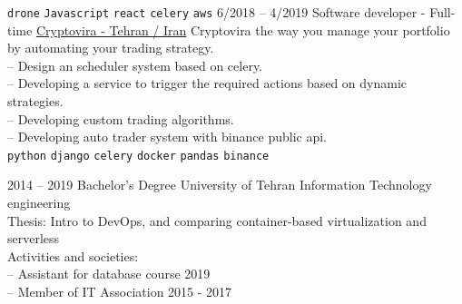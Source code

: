 \documentclass[9pt]{developercv}
\begin{document}
\begin{entrylist}
{		\texttt{drone}\slashsep
		\texttt{Javascript}\slashsep
		\texttt{react}\slashsep
		\texttt{celery}\slashsep
		\texttt{aws}\slashsep
	}
	\entry
	{6/2018 -- 4/2019}
	{Software developer - Full-time}
	{\href{https://crypovira.com/en}{Cryptovira - Tehran / Iran}}
	{
		Cryptovira the way you manage your portfolio by automating your trading strategy. \\
		-- Design an scheduler system based on celery. \\
		-- Developing a service to trigger the required actions based on dynamic strategies. \\
		-- Developing custom trading algorithms. \\
		-- Developing auto trader system with binance public api. \\

		\texttt{python}\slashsep
		\texttt{django}\slashsep
		\texttt{celery}\slashsep
		\texttt{docker}\slashsep
		\texttt{pandas}\slashsep
		\texttt{binance}\slashsep
	}
\end{entrylist}

\begin{entrylist}
	\entry
	{2014 -- 2019}
	{Bachelor's Degree}
	{University of Tehran}
	{
		Information Technology engineering \\
		Thesis: Intro to DevOps, and comparing container-based virtualization and serverless \\
		Activities and societies: \\
		-- Assistant for database course 2019 \\
		-- Member of IT Association 2015 - 2017 \\
	}
\end{entrylist}



\end{document}
